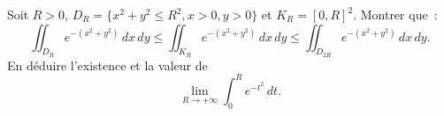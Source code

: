 \begin{exercice}\label{exoIntegralesMultiples0012}


Soit $R>0$, $D_R=\{x^2+y^2\leq R^2, x>0, y>0\}$ et $K_R=[0,R]^2$.  Montrer que~:
\begin{equation}\label{gaussian}
\iint_{D_R} e^{-(x^2+y^2)}\, dx\, dy \leq \iint_{K_R} e^{-(x^2+y^2)}\, dx\, dy \leq \iint_{D_{2R}} e^{-(x^2+y^2)}\, dx\, dy.
\end{equation}
En déduire l'existence et la valeur de
\begin{equation}
\lim_{R\rightarrow +\infty} \int_0^R e^{-t^2}\, dt.
\end{equation}


\end{exercice}
